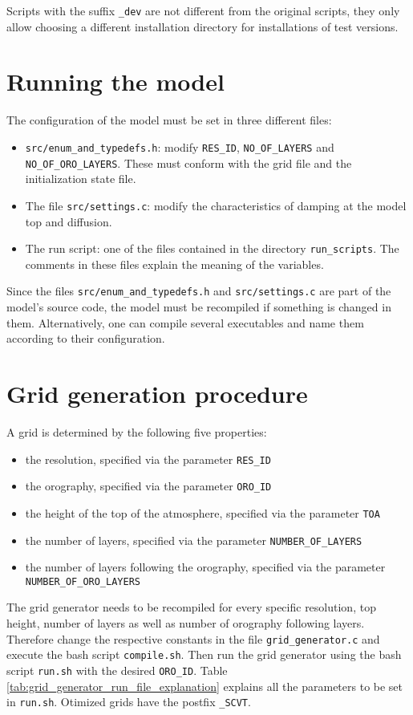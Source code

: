 \documentclass[10pt]{report}
\begin{document}
Scripts with the suffix \texttt{\_dev} are not different from the original scripts, they only allow choosing a different installation directory for installations of test versions.

\chapter{Running the model}
\label{chap:running_the_model}

The configuration of the model must be set in three different files:

\begin{itemize}
\item \texttt{src/enum\_and\_typedefs.h}: modify \texttt{RES\_ID}, \texttt{NO\_OF\_LAYERS} and \texttt{NO\_OF\_ORO\_LAYERS}. These must conform with the grid file and the initialization state file.
\item The file \texttt{src/settings.c}: modify the characteristics of damping at the model top and diffusion.
\item The run script: one of the files contained in the directory \texttt{run\_scripts}. The comments in these files explain the meaning of the variables.
\end{itemize}
%
Since the files \texttt{src/enum\_and\_typedefs.h} and \texttt{src/settings.c} are part of the model's source code, the model must be recompiled if something is changed in them. Alternatively, one can compile several executables and name them according to their configuration.

\chapter{Grid generation procedure}
\label{chap:grid_generation_procedure}

A grid is determined by the following five properties:

\begin{itemize}
\item the resolution, specified via the parameter \texttt{RES\_ID}
\item the orography, specified via the parameter \texttt{ORO\_ID}
\item the height of the top of the atmosphere, specified via the parameter \texttt{TOA}
\item the number of layers, specified via the parameter \texttt{NUMBER\_OF\_LAYERS}
\item the number of layers following the orography, specified via the parameter \texttt{NUMBER\_OF\_ORO\_LAYERS}
\end{itemize}
%
The grid generator needs to be recompiled for every specific resolution, top height, number of layers as well as number of orography following layers. Therefore change the respective constants in the file \texttt{grid\_generator.c} and execute the bash script \texttt{compile.sh}. Then run the grid generator using the bash script \texttt{run.sh} with the desired \texttt{\texttt{ORO\_ID}}. Table \ref{tab:grid_generator_run_file_explanation} explains all the parameters to be set in \texttt{run.sh}. Otimized grids have the postfix \texttt{\_SCVT}.
\end{document}
